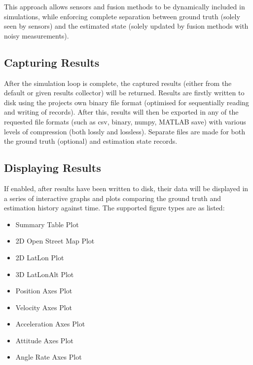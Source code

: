 \documentclass[letterpaper,10pt,english]{sphinxmanual}
\begin{document}
\sphinxAtStartPar
This approach allows sensors and fusion methods to be dynamically included in simulations, while enforcing complete
separation between ground truth (solely seen by sensors) and the estimated state (solely updated by fusion methods
with noisy measurements).


\subsection{Capturing Results}
\label{\detokenize{usage/technical:capturing-results}}
\sphinxAtStartPar
After the simulation loop is complete, the captured results (either from the default or given results collector)
will be returned. Results are firstly written to disk using the projects own binary file format (optimised for
sequentially reading and writing of records). After this, results will then be exported in any of the requested file
formats (such as csv, binary, numpy, MATLAB save) with various levels of compression (both lossly and lossless).
Separate files are made for both the ground truth (optional) and estimation state records.


\subsection{Displaying Results}
\label{\detokenize{usage/technical:displaying-results}}
\sphinxAtStartPar
If enabled, after results have been written to disk, their data will be displayed in a series of interactive
graphs and plots comparing the ground truth and estimation history against time. The supported figure types are
as listed:
\begin{itemize}
\item {} 
\sphinxAtStartPar
Summary Table Plot

\item {} 
\sphinxAtStartPar
2D Open Street Map Plot

\item {} 
\sphinxAtStartPar
2D Lat\sphinxhyphen{}Lon Plot

\item {} 
\sphinxAtStartPar
3D Lat\sphinxhyphen{}Lon\sphinxhyphen{}Alt Plot

\item {} 
\sphinxAtStartPar
Position Axes Plot

\item {} 
\sphinxAtStartPar
Velocity Axes Plot

\item {} 
\sphinxAtStartPar
Acceleration Axes Plot

\item {} 
\sphinxAtStartPar
Attitude Axes Plot

\item {} 
\sphinxAtStartPar
Angle Rate Axes Plot

\end{itemize}
\end{document}
